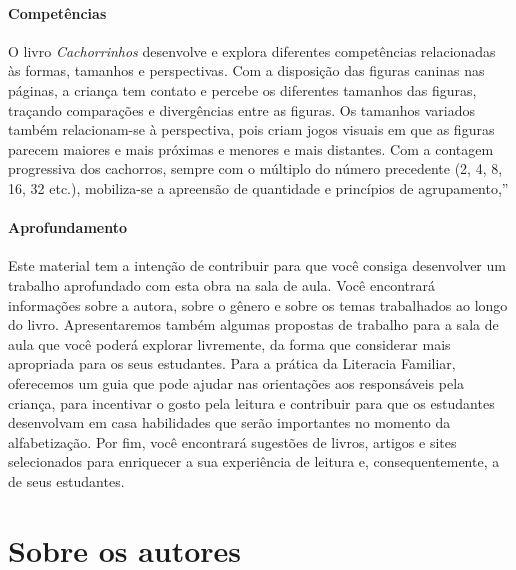 \documentclass[11pt]{extarticle}
\begin{document}
\paragraph{Competências}
O livro \textit{Cachorrinhos} desenvolve e explora diferentes competências relacionadas às formas, tamanhos e perspectivas. Com a disposição das figuras caninas nas páginas, a criança tem contato e percebe os diferentes tamanhos das figuras, traçando comparações e divergências entre as figuras. Os tamanhos variados também relacionam-se à perspectiva, pois criam jogos visuais em que as figuras parecem maiores e mais próximas e menores e mais distantes. Com a contagem progressiva dos cachorros, sempre com o múltiplo do número precedente (2, 4, 8, 16, 32 etc.), mobiliza-se a apreensão de quantidade e princípios de agrupamento,''


\paragraph{Aprofundamento} Este material tem a 
intenção de contribuir para que você consiga desenvolver um trabalho aprofundado 
com esta obra na sala de aula. Você encontrará informações sobre a autora, sobre 
o gênero e sobre os temas trabalhados ao longo do livro. Apresentaremos também 
algumas propostas de trabalho para a sala de aula que você poderá explorar livremente, 
da forma que considerar mais apropriada para os seus estudantes. Para a prática 
da Literacia Familiar, oferecemos um guia que pode ajudar nas orientações aos 
responsáveis pela criança, para incentivar o gosto pela leitura e contribuir para 
que os estudantes desenvolvam em casa habilidades que serão importantes no momento 
da alfabetização. Por fim, você encontrará sugestões de livros, artigos e sites 
selecionados para enriquecer a sua experiência de leitura e, 
consequentemente, a de seus estudantes.



\section{Sobre os autores}


\end{document}
